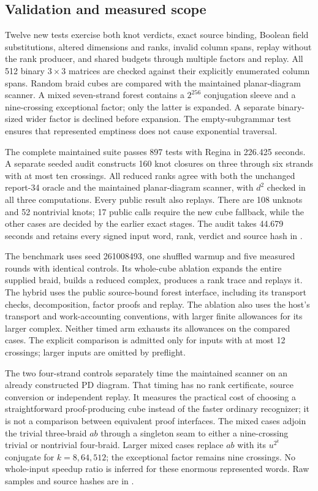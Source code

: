 \subsection{Validation and measured scope}

Twelve new tests exercise both knot verdicts, exact source binding, Boolean
field substitutions, altered dimensions and ranks, invalid column spans,
replay without the rank producer, and shared budgets through multiple factors
and replay. All 512 binary $3\times3$ matrices are checked against their
explicitly enumerated column spans. Random braid cubes are compared with the
maintained planar-diagram scanner. A mixed seven-strand forest contains a
$2^{256}$ conjugation sleeve and a nine-crossing exceptional factor; only the
latter is expanded. A separate binary-sized wider factor is declined before
expansion. The empty-subgrammar test ensures that represented emptiness does
not cause exponential traversal.

The complete maintained suite passes 897 tests with Regina in 226.425 seconds.
A separate seeded audit constructs 160 knot closures on three through six
strands with at most ten crossings. All reduced ranks agree with both the
unchanged report-34 oracle and the maintained planar-diagram scanner, with
$d^2$ checked in all three computations. Every public result also replays.
There are 108 unknots and 52 nontrivial knots; 17 public calls require the new
cube fallback, while the other cases are decided by the earlier exact stages.
The audit takes 44.679 seconds and retains every signed input word, rank,
verdict and source hash in .



The benchmark uses seed 261008493, one shuffled warmup and five measured
rounds with identical controls. Its whole-cube ablation expands the entire
supplied braid, builds a reduced complex, produces a rank trace and replays
it. The hybrid uses the public source-bound forest interface, including its
transport checks, decomposition, factor proofs and replay. The ablation also
uses the host's transport and work-accounting conventions, with larger finite
allowances for its larger complex. Neither timed arm exhausts its allowances
on the compared cases. The explicit comparison is admitted only for inputs
with at most 12 crossings; larger inputs are omitted by preflight.

The two four-strand controls separately time the maintained scanner on an
already constructed PD diagram. That timing has no rank certificate, source
conversion or independent replay. It measures the practical cost of choosing
a straightforward proof-producing cube instead of the faster ordinary
recognizer; it is not a comparison between equivalent proof interfaces.
The mixed cases adjoin the trivial three-braid $ab$ through a singleton seam
to either a nine-crossing trivial or nontrivial four-braid. Larger mixed cases
replace $ab$ with its $u^{2^k}$ conjugate for $k=8,64,512$; the exceptional
factor remains nine crossings. No whole-input speedup ratio is inferred for
these enormous represented words. Raw samples and source hashes are in
.

